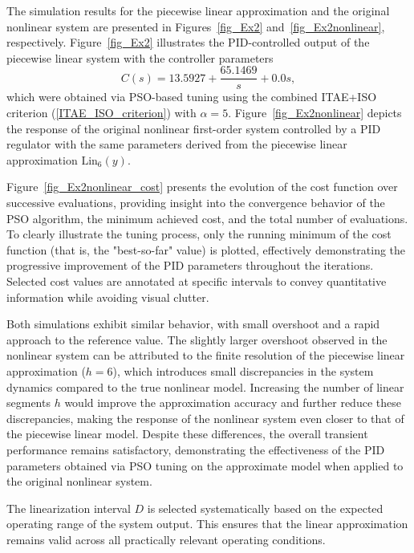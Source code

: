 \documentclass[preprint,12pt]{elsarticle}
\begin{document}


The simulation results for the piecewise linear approximation and the original nonlinear system are presented in Figures~\ref{fig_Ex2} and~\ref{fig_Ex2nonlinear}, respectively. Figure~\ref{fig_Ex2} illustrates the PID-controlled output of the piecewise linear system with the controller parameters 
\[
C(s) = 13.5927 + \frac{65.1469}{s} + 0.0s,
\] 
which were obtained via PSO-based tuning using the combined ITAE+ISO criterion (\ref{ITAE_ISO_criterion}) with \(\alpha = 5\). Figure~\ref{fig_Ex2nonlinear} depicts the response of the original nonlinear first-order system controlled by a PID regulator with the same parameters derived from the piecewise linear approximation \(\text{Lin}_{6}(y)\). 

Figure~\ref{fig_Ex2nonlinear_cost} presents the evolution of the cost function over successive evaluations, providing insight into the convergence behavior of the PSO algorithm, the minimum achieved cost, and the total number of evaluations. To clearly illustrate the tuning process, only the running minimum of the cost function (that is, the "best-so-far" value) is plotted, effectively demonstrating the progressive improvement of the PID parameters throughout the iterations. Selected cost values are annotated at specific intervals to convey quantitative information while avoiding visual clutter.

Both simulations exhibit similar behavior, with small overshoot and a rapid approach to the reference value. The slightly larger overshoot observed in the nonlinear system can be attributed to the finite resolution of the piecewise linear approximation (\(h = 6\)), which introduces small discrepancies in the system dynamics compared to the true nonlinear model. Increasing the number of linear segments \(h\) would improve the approximation accuracy and further reduce these discrepancies, making the response of the nonlinear system even closer to that of the piecewise linear model. Despite these differences, the overall transient performance remains satisfactory, demonstrating the effectiveness of the PID parameters obtained via PSO tuning on the approximate model when applied to the original nonlinear system.


The linearization interval \(D\) is selected systematically based on the expected operating range of the system output. This ensures that the linear approximation remains valid across all practically relevant operating conditions. 
\end{document}

